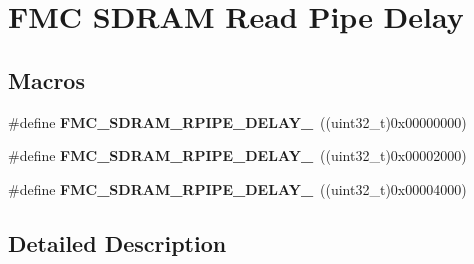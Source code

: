 \hypertarget{group___f_m_c___s_d_r_a_m___read___pipe___delay}{}\section{F\+MC S\+D\+R\+AM Read Pipe Delay}
\label{group___f_m_c___s_d_r_a_m___read___pipe___delay}
\subsection*{Macros}
\begin{DoxyCompactItemize}
\item 
\#define {\bfseries F\+M\+C\+\_\+\+S\+D\+R\+A\+M\+\_\+\+R\+P\+I\+P\+E\+\_\+\+D\+E\+L\+A\+Y\+\_}~((uint32\+\_\+t)0x00000000)\hypertarget{group___f_m_c___s_d_r_a_m___read___pipe___delay_gad9a15d936c86ced1dea32d8b11a484c5}{}\label{group___f_m_c___s_d_r_a_m___read___pipe___delay_gad9a15d936c86ced1dea32d8b11a484c5}

\item 
\#define {\bfseries F\+M\+C\+\_\+\+S\+D\+R\+A\+M\+\_\+\+R\+P\+I\+P\+E\+\_\+\+D\+E\+L\+A\+Y\+\_}~((uint32\+\_\+t)0x00002000)\hypertarget{group___f_m_c___s_d_r_a_m___read___pipe___delay_ga096bcdebed749e90e8e35d2627503f7a}{}\label{group___f_m_c___s_d_r_a_m___read___pipe___delay_ga096bcdebed749e90e8e35d2627503f7a}

\item 
\#define {\bfseries F\+M\+C\+\_\+\+S\+D\+R\+A\+M\+\_\+\+R\+P\+I\+P\+E\+\_\+\+D\+E\+L\+A\+Y\+\_}~((uint32\+\_\+t)0x00004000)\hypertarget{group___f_m_c___s_d_r_a_m___read___pipe___delay_gac26caa2b462887e9f7fa0c5f90298a83}{}\label{group___f_m_c___s_d_r_a_m___read___pipe___delay_gac26caa2b462887e9f7fa0c5f90298a83}

\end{DoxyCompactItemize}


\subsection{Detailed Description}
